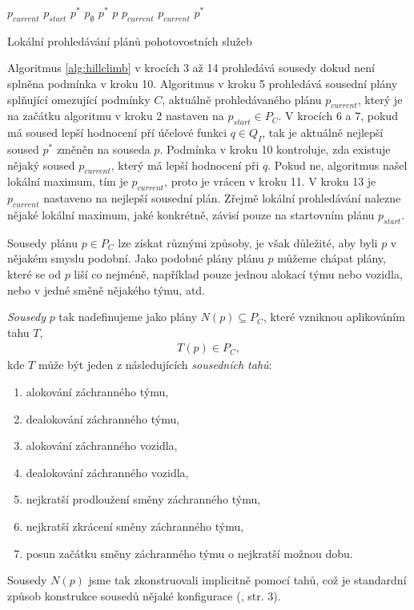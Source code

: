 \begin{algorithm}[H]
  \begin{algorithmic}[1]
    \State $p_{current}$ \gets $p_{start}$
      \State $p^*$ \gets $p_{\emptyset}$ 
          \State $p^*$ \gets $p$
        \EndIf
      \EndFor
        \State \Return $p_{current}$
      \EndIf
      \State $p_{current}$ \gets $p^*$
    \EndWhile
  \EndFunction
  \end{algorithmic}
  \caption{Lokální prohledávání plánů pohotovostních služeb}
  \label{alg:hillclimb}
\end{algorithm}

Algoritmus \ref{alg:hillclimb} v krocích 3 až 14 prohledává sousedy dokud není splněna podmínka v kroku 10.
Algoritmus v kroku 5 prohledává sousední plány splňující omezující podmínky $C$, aktuálně prohledávaného plánu $p_{current}$, který je na začátku algoritmu v kroku 2 nastaven na $p_{start} \in P_C$.
V krocích 6 a 7, pokud má soused lepší hodnocení pří účelové funkci $q \in Q_I$, tak je aktuálně nejlepší soused $p^*$ změněn na souseda $p$.
Podmínka v kroku 10 kontroluje, zda existuje nějaký soused $p_{current}$, který má lepší hodnocení při $q$.
Pokud ne, algoritmus našel lokální maximum, tím je $p_{current}$, proto je vrácen v kroku 11.
V kroku 13 je $p_{current}$ nastaveno na nejlepší sousední plán.
Zřejmě lokální prohledávání nalezne nějaké lokální maximum, jaké konkrétně, závisí pouze na startovním plánu $p_{start}$.

Sousedy plánu $p \in P_C$ lze získat různými způsoby, je však důležité, aby byli $p$ v nějakém smyslu podobní.
Jako podobné plány plánu $p$ můžeme chápat plány, které se od $p$ liší co nejméně, například pouze jednou alokací týmu nebo vozidla,
nebo v jedné směně nějakého týmu, atd.\

\textit{Sousedy} $p$ tak nadefinujeme jako plány $N(p) \subseteq P_C$, které vzniknou aplikováním tahu $T$,
\begin{align*}
  T(p) \in P_C,
\end{align*}
kde $T$ může být jeden z následujících \textit{sousedních tahů}:
\begin{enumerate}
  \item alokování záchranného týmu,
  \item dealokování záchranného týmu,
  \item alokování záchranného vozidla,
  \item dealokování záchranného vozidla,
  \item nejkratší prodloužení směny záchranného týmu,
  \item nejkratší zkrácení směny záchranného týmu,
  \item posun začátku směny záchranného týmu o nejkratší možnou dobu.
\end{enumerate}
Sousedy $N(p)$ jsme tak zkonstruovali implicitně pomocí tahů, což je standardní způsob konstrukce sousedů nějaké konfigurace (\cite{HybridMeta}, str. 3).

